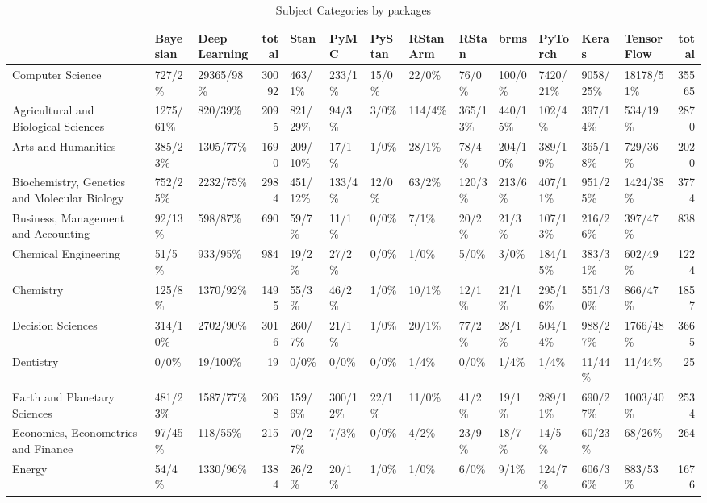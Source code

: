\documentclass[AMA,STIX1COL]{WileyNJD-v2}
\begin{document}
\begin{table}
\centering
\caption{Subject Categories by packages\label{tab1}}
\resizebox{\textwidth}{!}
{\begin{tabular}{p{}|l|p{}|r||l|l|l|l|l|l|l|l|l|r}
\hline
  & Bayesian & Deep Learning & total & Stan & PyMC & PyStan & RStanArm & RStan & brms & PyTorch & Keras & TensorFlow & total\\
\hline
Computer Science & 727/2\% & 29365/98\% & 30092 & 463/1\% & 233/1\% & 15/0\% & 22/0\% & 76/0\% & 100/0\% & 7420/21\% & 9058/25\% & 18178/51\% & 35565\\
\hline
Agricultural and Biological Sciences & 1275/61\% & 820/39\% & 2095 & 821/29\% & 94/3\% & 3/0\% & 114/4\% & 365/13\% & 440/15\% & 102/4\% & 397/14\% & 534/19\% & 2870\\
\hline
Arts and Humanities & 385/23\% & 1305/77\% & 1690 & 209/10\% & 17/1\% & 1/0\% & 28/1\% & 78/4\% & 204/10\% & 389/19\% & 365/18\% & 729/36\% & 2020\\
\hline
Biochemistry, Genetics and Molecular Biology & 752/25\% & 2232/75\% & 2984 & 451/12\% & 133/4\% & 12/0\% & 63/2\% & 120/3\% & 213/6\% & 407/11\% & 951/25\% & 1424/38\% & 3774\\
\hline
Business, Management and Accounting & 92/13\% & 598/87\% & 690 & 59/7\% & 11/1\% & 0/0\% & 7/1\% & 20/2\% & 21/3\% & 107/13\% & 216/26\% & 397/47\% & 838\\
\hline
Chemical Engineering & 51/5\% & 933/95\% & 984 & 19/2\% & 27/2\% & 0/0\% & 1/0\% & 5/0\% & 3/0\% & 184/15\% & 383/31\% & 602/49\% & 1224\\
\hline
Chemistry & 125/8\% & 1370/92\% & 1495 & 55/3\% & 46/2\% & 1/0\% & 10/1\% & 12/1\% & 21/1\% & 295/16\% & 551/30\% & 866/47\% & 1857\\
\hline
Decision Sciences & 314/10\% & 2702/90\% & 3016 & 260/7\% & 21/1\% & 1/0\% & 20/1\% & 77/2\% & 28/1\% & 504/14\% & 988/27\% & 1766/48\% & 3665\\
\hline
Dentistry & 0/0\% & 19/100\% & 19 & 0/0\% & 0/0\% & 0/0\% & 1/4\% & 0/0\% & 1/4\% & 1/4\% & 11/44\% & 11/44\% & 25\\
\hline
Earth and Planetary Sciences & 481/23\% & 1587/77\% & 2068 & 159/6\% & 300/12\% & 22/1\% & 11/0\% & 41/2\% & 19/1\% & 289/11\% & 690/27\% & 1003/40\% & 2534\\
\hline
Economics, Econometrics and Finance & 97/45\% & 118/55\% & 215 & 70/27\% & 7/3\% & 0/0\% & 4/2\% & 23/9\% & 18/7\% & 14/5\% & 60/23\% & 68/26\% & 264\\
\hline
Energy & 54/4\% & 1330/96\% & 1384 & 26/2\% & 20/1\% & 1/0\% & 1/0\% & 6/0\% & 9/1\% & 124/7\% & 606/36\% & 883/53\% & 1676\\

\end{tabular}}
\end{table}
\end{document}
